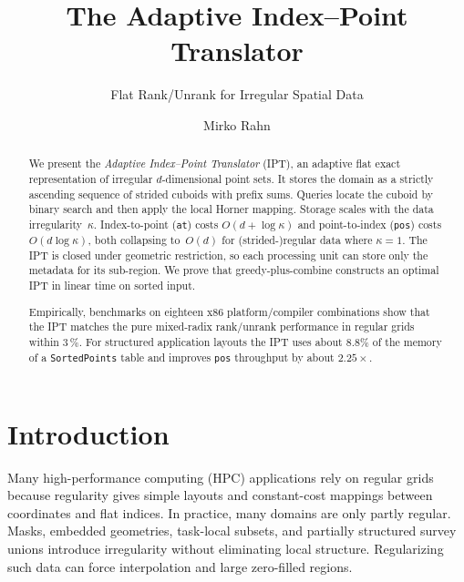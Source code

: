\documentclass[manuscript,screen,review]{acmart}
\title[Adaptive Index--Point Translator]{The Adaptive Index--Point Translator}
\subtitle{Flat Rank/Unrank for Irregular Spatial Data}
\author{Mirko Rahn}
\affiliation{%
  \institution{Fraunhofer ITWM}
  \city{Kaiserslautern}
  \country{Germany}}
\theoremstyle{definition}
\theoremstyle{plain}
\begin{document}
\begin{abstract}
We present the \emph{Adaptive Index--Point Translator} (IPT), an
adaptive flat exact representation of irregular $d$-dimensional point
sets. It stores the domain as a strictly ascending sequence of strided
cuboids with prefix sums. Queries locate the cuboid by binary search
and then apply the local Horner mapping. Storage scales with the data
irregularity~$\kappa$. Index-to-point (\texttt{at}) costs $O(d +
\log\kappa)$ and point-to-index (\texttt{pos}) costs $O(d\log\kappa)$,
both collapsing to~$O(d)$ for (strided-)regular data where
$\kappa=1$. The IPT is closed under geometric restriction, so each
processing unit can store only the metadata for its sub-region. We
prove that greedy-plus-combine constructs an optimal IPT in linear
time on sorted input.

Empirically, benchmarks on eighteen x86 platform/compiler combinations
show that the IPT matches the pure mixed-radix rank/unrank performance
in regular grids within $3\,\%$. For structured application layouts
the IPT uses about $8.8\%$ of the memory of a \texttt{SortedPoints}
table and improves \texttt{pos} throughput by about $2.25\times$.
\end{abstract}



\maketitle

\section{Introduction}
\label{section:introduction}

Many high-performance computing (HPC) applications rely on regular
grids because regularity gives simple layouts and constant-cost
mappings between coordinates and flat indices. In practice, many
domains are only partly regular. Masks, embedded geometries,
task-local subsets, and partially structured survey unions introduce
irregularity without eliminating local structure. Regularizing such
data can force interpolation and large zero-filled regions.
\end{document}
